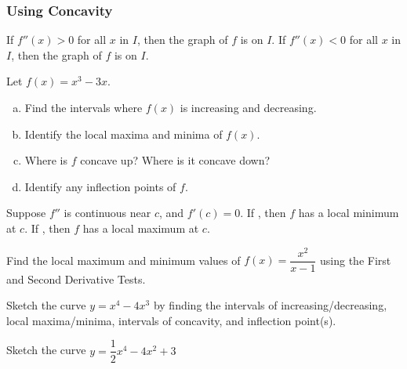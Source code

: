 \documentclass[notes]{subfiles}
\begin{document}
	\subsubsection*{Using Concavity}
		\begin{thm}
			If \(f''(x) > 0\) for all \(x\) in \(I\), then the graph of \(f\) is  on \(I\).  If \(f''(x) < 0\)\vspace{20pt} for all \(x\) in \(I\), then the graph of \(f\) is  on \(I\).
		\end{thm}
		
		\begin{ex}
			Let \(f(x) = x^3 - 3x\).  
			\begin{enumerate}[(a)]
				\item Find the intervals where \(f(x)\) is increasing and decreasing.
					
				\item Identify the local maxima and minima of \(f(x)\).
					
				\item Where is \(f\) concave up?  Where is it concave down?
					
				\item Identify any inflection points of \(f\).
			\end{enumerate}
		\end{ex}
			\newpage

			
		\begin{thm}
			Suppose \(f''\) is continuous near \(c\), and \(f'(c) = 0\).  If , then \(f\) has a local\vspace{20pt} minimum at \(c\).  If , then \(f\) has a local maximum at \(c\).
		\end{thm}

		\begin{ex}
			Find the local maximum and minimum values of \(f(x) = \dfrac{x^2}{x-1}\) using the First and Second Derivative Tests.
		\end{ex}
			\vs{1}
			
		\begin{ex}
			Sketch the curve \(y = x^4-4x^3\) by finding the intervals of increasing/decreasing, local maxima/minima, intervals of concavity, and inflection point(s).
		\end{ex}
			\vs{1}
			\newpage
			
		\begin{ex}
			Sketch the curve \(y=\dfrac{1}{2}x^4 -4x^2 + 3\)
		\end{ex}
			
\end{document}
